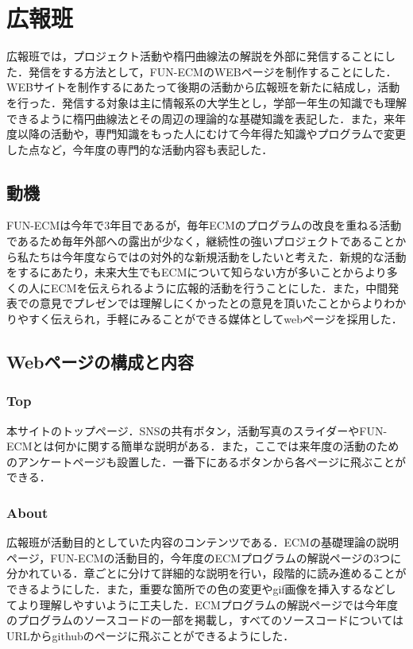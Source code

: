 \documentclass[openany,11pt,papersize]{jsbook}
\begin{document}
\section{広報班}
広報班では，プロジェクト活動や楕円曲線法の解説を外部に発信することにした．発信をする方法として，FUN-ECMのWEBページを制作することにした．WEBサイトを制作するにあたって後期の活動から広報班を新たに結成し，活動を行った．発信する対象は主に情報系の大学生とし，学部一年生の知識でも理解できるように楕円曲線法とその周辺の理論的な基礎知識を表記した．また，来年度以降の活動や，専門知識をもった人にむけて今年得た知識やプログラムで変更した点など，今年度の専門的な活動内容も表記した．

\subsection{動機}
FUN-ECMは今年で3年目であるが，毎年ECMのプログラムの改良を重ねる活動であるため毎年外部への露出が少なく，継続性の強いプロジェクトであることから私たちは今年度ならではの対外的な新規活動をしたいと考えた．新規的な活動をするにあたり，未来大生でもECMについて知らない方が多いことからより多くの人にECMを伝えられるように広報的活動を行うことにした．また，中間発表での意見でプレゼンでは理解しにくかったとの意見を頂いたことからよりわかりやすく伝えられ，手軽にみることができる媒体としてwebページを採用した．


\subsection{Webページの構成と内容}
\subsubsection{Top}
本サイトのトップページ．SNSの共有ボタン，活動写真のスライダーやFUN-ECMとは何かに関する簡単な説明がある．また，ここでは来年度の活動のためのアンケートページも設置した．一番下にあるボタンから各ページに飛ぶことができる．


\subsubsection{About}
広報班が活動目的としていた内容のコンテンツである．ECMの基礎理論の説明ページ，FUN-ECMの活動目的，今年度のECMプログラムの解説ページの3つに分かれている．章ごとに分けて詳細的な説明を行い，段階的に読み進めることができるようにした．また，重要な箇所での色の変更やgif画像を挿入するなどしてより理解しやすいように工夫した．ECMプログラムの解説ページでは今年度のプログラムのソースコードの一部を掲載し，すべてのソースコードについてはURLからgithubのページに飛ぶことができるようにした．
\end{document}
